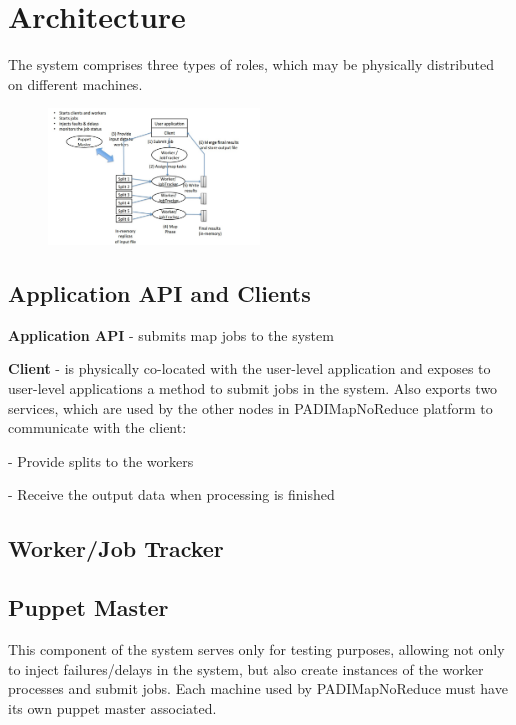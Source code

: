 \section {Architecture}

The system comprises three types of roles, which may be physically distributed on different machines.

\begin{figure}[h!]
  \centering
    \includegraphics[width=0.5\textwidth]{pictures/PADIMapNoReduceArchitecture.jpg}
    \caption{}
\end{figure}


\subsection {Application API and Clients }

\textbf{Application API} - submits map jobs to the system

\textbf{Client} - is physically co-located with the user-level application and exposes to user-level applications a method to submit jobs in the system. Also exports two services, which are used by the other nodes in PADIMapNoReduce platform to communicate with the client:

\vspace*{8pt}%
- Provide splits to the workers

- Receive the output data when processing is finished
\vspace*{8pt}%


\subsection {Worker/Job Tracker}




\subsection {Puppet Master}
This component of the system serves only for testing purposes, allowing not only to inject failures/delays in the system, but also create instances of the worker processes and submit jobs. Each machine used by PADIMapNoReduce must have its own puppet master associated.
